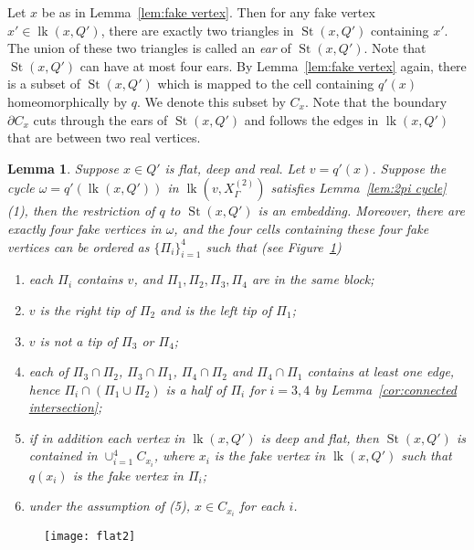\documentclass[11pt]{amsart}
\newcommand{\lk}{\operatorname{lk}}
\newcommand{\St}{\operatorname{St}}
\newtheorem{lemma}[theorem]{Lemma}
\theoremstyle{definition}
\begin{document}
Let $x$ be as in Lemma~\ref{lem:fake vertex}. Then for any fake vertex $x'\in\lk(x,Q')$, there are exactly two triangles in $\St(x,Q')$ containing $x'$. The union of these two triangles is called an \emph{ear} of $\St(x,Q')$. Note that $\St(x,Q')$ can have at most four ears. By Lemma~\ref{lem:fake vertex} again, there is a subset of $\St(x,Q')$ which is mapped to the cell containing $q'(x)$ homeomorphically by $q$. We denote this subset by $C_x$. Note that the boundary $\partial C_x$ cuts through the ears of $\St(x,Q')$ and follows the edges in $\lk(x,Q')$ that are between two real vertices.

\begin{lemma}
	\label{lem:real1}
Suppose $x\in Q'$ is flat, deep and real. Let $v=q'(x)$. Suppose the cycle $\omega=q'(\lk(x,Q'))$ in $\lk(v,X^{(2)}_\Gamma)$ satisfies Lemma~\ref{lem:2pi cycle} (1), then the restriction of $q$ to $\St(x,Q')$ is an embedding. Moreover, there are exactly four fake vertices in $\omega$, and the four cells containing these four fake vertices can be ordered as $\{\Pi_i\}_{i=1}^{4}$ such that (see Figure~\ref{f:flat2})
\begin{enumerate}
	\item each $\Pi_i$ contains $v$, and 
	$\Pi_1,\Pi_2,\Pi_3,\Pi_4$ are in the same block;
	\item $v$ is the right tip of $\Pi_2$ and is the left tip of $\Pi_1$;
	\item $v$ is not a tip of $\Pi_3$ or $\Pi_4$;
	\item each of $\Pi_3\cap\Pi_2$, $\Pi_3\cap\Pi_1$, $\Pi_4\cap\Pi_2$ and $\Pi_4\cap\Pi_1$ contains at least one edge, hence $\Pi_i\cap (\Pi_1\cup\Pi_2)$ is a half of $\Pi_i$ for $i=3,4$ by Lemma~\ref{cor:connected intersection};
	\item if in addition each vertex in $\lk(x,Q')$ is deep and flat, then $\St(x,Q')$ is contained in $\cup_{i=1}^4C_{x_i}$, where $x_i$ is the fake vertex in $\lk(x,Q')$ such that $q(x_i)$ is the fake vertex in $\Pi_i$;
	\item under the assumption of (5), $x\in C_{x_i}$ for each $i$.
\end{enumerate}
\end{lemma}

\begin{figure}[h!]
	\centering
	\texttt{[image: flat2]}
	\caption{}
	\label{f:flat2}
\end{figure}
\end{document}
